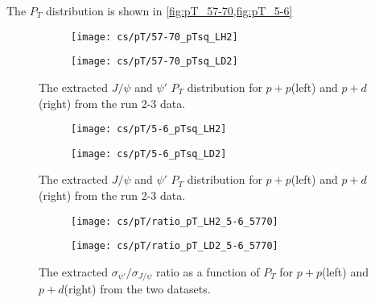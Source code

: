 \documentclass[../main.tex]{subfiles}
\begin{document}

The $P_T$ distribution is shown in \cref{fig:pT_57-70,fig:pT_5-6}
\begin{figure}[h!]
	\centering
	\begin{subfigure}{0.45\linewidth}
		\texttt{[image: cs/pT/57-70\_pTsq\_LH2]}
	\end{subfigure}
	\begin{subfigure}{0.45\linewidth}
		\texttt{[image: cs/pT/57-70\_pTsq\_LD2]}
	\end{subfigure}
	\caption{The extracted $J/\psi$ and $\psi'$ $P_T$ distribution for $p+p$(left)
	and $p+d$(right) from the run 2-3 data.}
	\label{fig:pT_57-70}
\end{figure}
\begin{figure}[h!]
	\centering
	\begin{subfigure}{0.45\linewidth}
		\texttt{[image: cs/pT/5-6\_pTsq\_LH2]}
	\end{subfigure}
	\begin{subfigure}{0.45\linewidth}
		\texttt{[image: cs/pT/5-6\_pTsq\_LD2]}
	\end{subfigure}
	\caption{The extracted $J/\psi$ and $\psi'$ $P_T$ distribution for $p+p$(left)
	and $p+d$(right) from the run 2-3 data.}
	\label{fig:pT_5-6}
\end{figure}
\begin{figure}[h!]
	\centering
	\begin{subfigure}{0.45\linewidth}
		\texttt{[image: cs/pT/ratio\_pT\_LH2\_5-6\_5770]}
	\end{subfigure}
	\begin{subfigure}{0.45\linewidth}
		\texttt{[image: cs/pT/ratio\_pT\_LD2\_5-6\_5770]}
	\end{subfigure}
	\caption{The extracted  $\sigma_{\psi'}/\sigma_{J/\psi}$ ratio as a function of $P_T$ for $p+p$(left)
	and $p+d$(right) from the two datasets.}
\end{figure}
\end{document}
